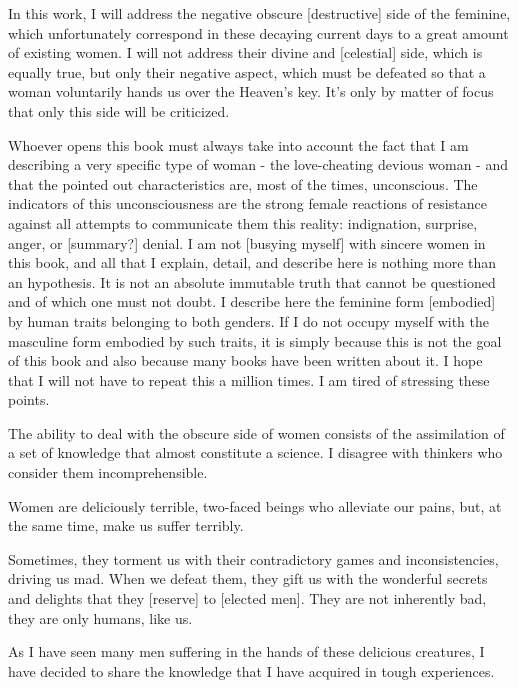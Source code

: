 
\par In this work, I will address the negative obscure [destructive] side of the feminine, which unfortunately correspond in these decaying current days to a great amount of existing women.
I will not address their divine and [celestial] side, which is equally true, but only their negative aspect, which must be defeated so that a woman voluntarily hands us over the Heaven's key.
It's only by matter of focus that only this side will be criticized.

\par Whoever opens this book must always take into account the fact that I am describing a very specific type of woman - the love-cheating devious woman - and that the pointed out characteristics are, most of the times, unconscious.
The indicators of this unconsciousness are the strong female reactions of resistance against all attempts to communicate them this reality: indignation, surprise, anger, or [summary?] denial.
I am not [busying myself] with sincere women in this book, and all that I explain, detail, and describe here is nothing more than an hypothesis.
It is not an absolute immutable truth that cannot be questioned and of which one must not doubt.
I describe here the feminine form [embodied] by human traits belonging to both genders.
If I do not occupy myself with the masculine form embodied by such traits, it is simply because this is not the goal of this book and also because many books have been written about it.
I hope that I will not have to repeat this a million times. I am tired of stressing these points.

 The ability to deal with the obscure side of women consists of the assimilation of a set of knowledge that almost constitute a science.
 I disagree with thinkers who consider them incomprehensible.
 
 Women are deliciously terrible, two-faced beings who alleviate our pains, but, at the same time, make us suffer terribly.
 
 Sometimes, they torment us with their contradictory games and inconsistencies, driving us mad.
 When we defeat them, they gift us with the wonderful secrets and delights that they [reserve] to [elected men].
 They are not inherently bad, they are only humans, like us.
 
As I have seen many men suffering in the hands of these delicious creatures, I have decided to share the knowledge that I have acquired in tough experiences.

